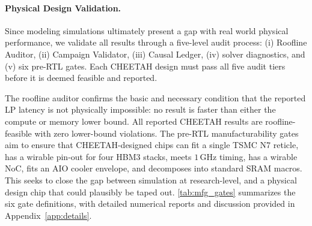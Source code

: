 \paragraph{Physical Design Validation.} Since modeling simulations ultimately present a gap with real world physical performance, we validate all results through a five-level audit process: (i) Roofline Auditor, (ii) Campaign Validator, (iii) Causal Ledger, (iv) solver diagnostics, and (v) six pre-RTL gates. Each CHEETAH design must pass all five audit tiers before it is deemed feasible and reported. 

The roofline auditor confirms the basic and necessary condition that the reported LP latency is not physically impossible: no result is faster than either the compute or memory lower bound. All reported CHEETAH results are roofline-feasible with zero lower-bound violations. 
The pre-RTL manufacturability gates aim to ensure that CHEETAH-designed chips can fit a single TSMC N7 reticle, has a wirable pin-out for four HBM3 stacks, meets $1\,\mathrm{GHz}$ timing, has a wirable NoC, fits an AIO cooler envelope, and decomposes into standard SRAM macros.
This seeks to close the gap between simulation at research-level, and a physical design chip that could plausibly be taped out.
\cref{tab:mfg_gates} summarizes the six gate definitions, with detailed numerical reports and discussion provided in Appendix~\ref{app:details}. 


